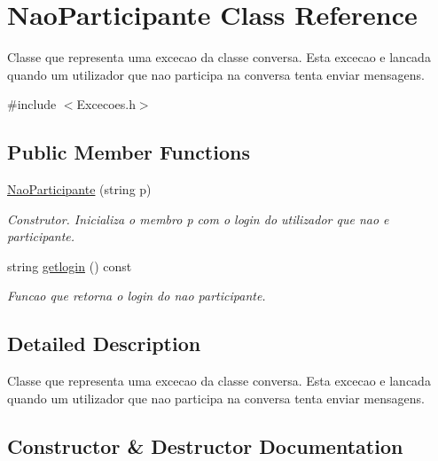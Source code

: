 \hypertarget{class_nao_participante}{}\section{Nao\+Participante Class Reference}
\label{class_nao_participante}


Classe que representa uma excecao da classe conversa. Esta excecao e lancada quando um utilizador que nao participa na conversa tenta enviar mensagens.  




{\ttfamily \#include $<$Excecoes.\+h$>$}

\subsection*{Public Member Functions}
\begin{DoxyCompactItemize}
\item 
\hyperlink{class_nao_participante_af0a256b2f1b44f856076b083966793f6}{Nao\+Participante} (string p)
\begin{DoxyCompactList}\small\item\em Construtor. Inicializa o membro p com o login do utilizador que nao e participante. \end{DoxyCompactList}\item 
string \hyperlink{class_nao_participante_a6199680fa5f2abfb8abb583d11fc3fd9}{getlogin} () const 
\begin{DoxyCompactList}\small\item\em Funcao que retorna o login do nao participante. \end{DoxyCompactList}\end{DoxyCompactItemize}


\subsection{Detailed Description}
Classe que representa uma excecao da classe conversa. Esta excecao e lancada quando um utilizador que nao participa na conversa tenta enviar mensagens. 

\subsection{Constructor \& Destructor Documentation}
\hypertarget{class_nao_participante_af0a256b2f1b44f856076b083966793f6}{}

